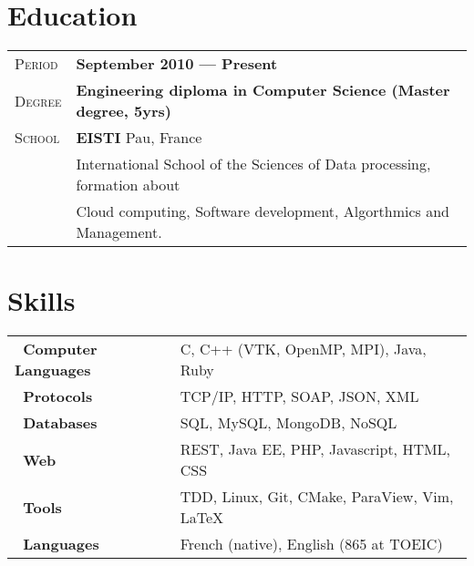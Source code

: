 \documentclass[a4paper, oneside, final]{scrartcl} %
\newcommand{\gray}{\rowcolor[gray]{.90}} %
\begin{document}
\begin{center}

\section{Education}

\begin{tabularx}{1\linewidth}{>{\raggedleft\scshape}p{2cm}X}
  \gray Period & \textbf{September 2010 --- Present}\\
    \gray Degree & \textbf{Engineering diploma in Computer Science (Master degree, 5yrs)}\\
  \gray School & \textbf{EISTI} \hfill Pau, France\\
  & International School of the Sciences of Data processing, formation about\\
  & Cloud computing, Software development, Algorthmics and Management.
\end{tabularx}


\section{Skills}

\begin{tabular}{@{}>{\bfseries}l@{\hspace{4ex}}l}%
~Computer Languages & C, C++ (VTK, OpenMP, MPI), Java, Ruby \\%
~Protocols          & TCP/IP, HTTP, SOAP, JSON, XML\\%
~Databases          & SQL, MySQL, MongoDB, NoSQL \\%
~Web                & REST, Java EE, PHP, Javascript, HTML, CSS \\%
~Tools              & TDD, Linux, Git, CMake, ParaView, Vim, \LaTeX\\%
~Languages          & French (native), English (865 at TOEIC)
\end{tabular}





\end{center}
\end{document}

